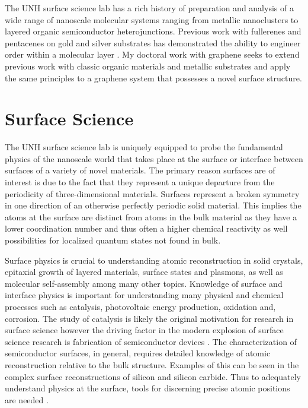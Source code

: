 The UNH surface science lab has a rich history of preparation and analysis of a wide range of nanoscale molecular systems ranging from metallic nanoclusters to layered organic semiconductor heterojunctions. Previous work with fullerenes and pentacenes on gold and silver substrates has demonstrated the ability to engineer order within a molecular layer \cite{bogdan-sulfur, bogdanc60, wang, wang-nano, amanda-ttpo}. My doctoral work with graphene seeks to extend previous work with classic organic materials and metallic substrates and apply the same principles to a graphene system that possesses a novel surface structure.

\section{Surface Science}
The UNH surface science lab is uniquely equipped to probe the fundamental physics of the nanoscale world that takes place at the surface or interface between surfaces of a variety of novel materials. The primary reason surfaces are of interest is due to the fact that they represent a unique departure from the periodicity of three-dimensional materials. Surfaces represent a broken symmetry in one direction of an otherwise perfectly periodic solid material. This implies the atoms at the surface are distinct from atoms in the bulk material as they have a lower coordination number and thus often a higher chemical reactivity as well possibilities for localized quantum states not found in bulk.

Surface physics is crucial to understanding atomic reconstruction in solid crystals, epitaxial growth of layered materials, surface states and plasmons, as well as molecular self-assembly among many other topics. Knowledge of surface and interface physics is important for understanding many physical and chemical processes such as catalysis, photovoltaic energy production, oxidation and, corrosion. The study of catalysis is likely the original motivation for research in surface science however the driving factor in the modern explosion of surface science research is fabrication of semiconductor devices \cite{SurfSciTechniques}. The characterization of semiconductor surfaces, in general, requires detailed knowledge of atomic reconstruction relative to the bulk structure. Examples of this can be seen in the complex surface reconstructions of silicon and silicon carbide. Thus to adequately understand physics at the surface, tools for discerning precise atomic positions are needed \cite{SurfSciTechniques}.

